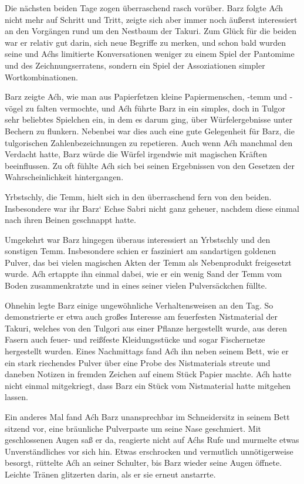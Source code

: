 \trennzeichen



Die nächsten beiden Tage zogen überraschend rasch vorüber. Barz folgte Aćh nicht mehr auf Schritt und Tritt, zeigte sich aber immer noch äußerst interessiert an den Vorgängen rund um den Nestbaum der Takuri. Zum Glück für die beiden war er relativ gut darin, sich neue Begriffe zu merken, und schon bald wurden seine und Aćhs limitierte Konversationen weniger zu einem Spiel der Pantomime und des Zeichnungserratens, sondern ein Spiel der Assoziationen simpler Wortkombinationen.

Barz zeigte Aćh, wie man aus Papierfetzen kleine Papiermenschen, -temm und -vögel zu falten vermochte, und Aćh führte Barz in ein simples, doch in Tulgor sehr beliebtes Spielchen ein, in dem es darum ging, über Würfelergebnisse unter Bechern zu flunkern. Nebenbei war dies auch eine gute Gelegenheit für Barz, die tulgorischen Zahlenbezeichnungen zu repetieren. Auch wenn Aćh manchmal den Verdacht hatte, Barz würde die Würfel irgendwie mit magischen Kräften beeinflussen. Zu oft fühlte Aćh sich bei seinen Ergebnissen von den Gesetzen der Wahrscheinlichkeit hintergangen.

Yrbstschly, die Temm, hielt sich in den überraschend fern von den beiden. Insbesondere war ihr Barz‘ Echse Sabri nicht ganz geheuer, nachdem diese einmal nach ihren Beinen geschnappt hatte.

Umgekehrt war Barz hingegen überaus interessiert an Yrbstschly und den sonstigen Temm. Insbesondere schien er fasziniert am sandartigen goldenen Pulver, das bei vielen magischen Akten der Temm als Nebenprodukt freigesetzt wurde. Aćh ertappte ihn einmal dabei, wie er ein wenig Sand der Temm vom Boden zusammenkratzte und in eines seiner vielen Pulversäckchen füllte.

Ohnehin legte Barz einige ungewöhnliche Verhaltensweisen an den Tag. So demonstrierte er etwa auch großes Interesse am feuerfesten Nistmaterial der Takuri, welches von den Tulgori aus einer Pflanze hergestellt wurde, aus deren Fasern auch feuer- und reißfeste Kleidungsstücke und sogar Fischernetze hergestellt wurden. Eines Nachmittags fand Aćh ihn neben seinem Bett, wie er ein stark riechendes Pulver über eine Probe des Nistmaterials streute und daneben Notizen in fremden Zeichen auf einem Stück Papier machte. Aćh hatte nicht einmal mitgekriegt, dass Barz ein Stück vom Nistmaterial hatte mitgehen lassen.

Ein anderes Mal fand Aćh Barz unansprechbar im Schneidersitz in seinem Bett sitzend vor, eine bräunliche Pulverpaste um seine Nase geschmiert. Mit geschlossenen Augen saß er da, reagierte nicht auf Aćhs Rufe und murmelte etwas Unverständliches vor sich hin. Etwas erschrocken und vermutlich unnötigerweise besorgt, rüttelte Aćh an seiner Schulter, bis Barz wieder seine Augen öffnete. Leichte Tränen glitzerten darin, als er sie erneut anstarrte.

